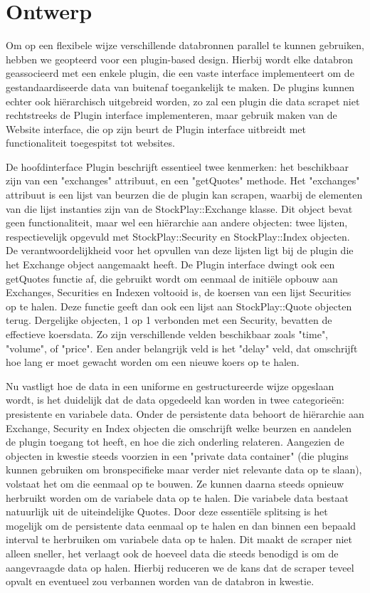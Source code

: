 \section{Ontwerp}

Om op een flexibele wijze verschillende databronnen parallel te kunnen gebruiken, hebben we geopteerd voor een plugin-based design. Hierbij wordt elke databron geassocieerd met een enkele plugin, die een vaste interface implementeert om de gestandaardiseerde data van buitenaf toegankelijk te maken. De plugins kunnen echter ook hi\"erarchisch uitgebreid worden, zo zal een plugin die data scrapet niet rechtstreeks de Plugin interface implementeren, maar gebruik maken van de Website interface, die op zijn beurt de Plugin interface uitbreidt met functionaliteit toegespitst tot websites.

De hoofdinterface Plugin beschrijft essentieel twee kenmerken: het beschikbaar zijn van een "exchanges" attribuut, en een "getQuotes" methode. Het "exchanges" attribuut is een lijst van beurzen die de plugin kan scrapen, waarbij de elementen van die lijst instanties zijn van de StockPlay::Exchange klasse. Dit object bevat geen functionaliteit, maar wel een hi\"erarchie aan andere objecten: twee lijsten, respectievelijk opgevuld met StockPlay::Security en StockPlay::Index objecten. De verantwoordelijkheid voor het opvullen van deze lijsten ligt bij de plugin die het Exchange object aangemaakt heeft.
De Plugin interface dwingt ook een getQuotes functie af, die gebruikt wordt om eenmaal de initi\"ele opbouw aan Exchanges, Securities en Indexen voltooid is, de koersen van een lijst Securities op te halen. Deze functie geeft dan ook een lijst aan StockPlay::Quote objecten terug. Dergelijke objecten, 1 op 1 verbonden met een Security, bevatten de effectieve koersdata. Zo zijn verschillende velden beschikbaar zoals "time", "volume", of "price". Een ander belangrijk veld is het "delay" veld, dat omschrijft hoe lang er moet gewacht worden om een nieuwe koers op te halen.

Nu vastligt hoe de data in een uniforme en gestructureerde wijze opgeslaan wordt, is het duidelijk dat de data opgedeeld kan worden in twee categorie\"en: presistente en variabele data.
Onder de persistente data behoort de hi\"erarchie aan Exchange, Security en Index objecten die omschrijft welke beurzen en aandelen de plugin toegang tot heeft, en hoe die zich onderling relateren. Aangezien de objecten in kwestie steeds voorzien in een "private data container" (die plugins kunnen gebruiken om bronspecifieke maar verder niet relevante data op te slaan), volstaat het om die eenmaal op te bouwen. Ze kunnen daarna steeds opnieuw herbruikt worden om de variabele data op te halen. Die variabele data bestaat natuurlijk uit de uiteindelijke Quotes.
Door deze essenti\"ele splitsing is het mogelijk om de persistente data eenmaal op te halen en dan binnen een bepaald interval te herbruiken om variabele data op te halen. Dit maakt de scraper niet alleen sneller, het verlaagt ook de hoeveel data die steeds benodigd is om de aangevraagde data op halen. Hierbij reduceren we de kans dat de scraper teveel opvalt en eventueel zou verbannen worden van de databron in kwestie.

